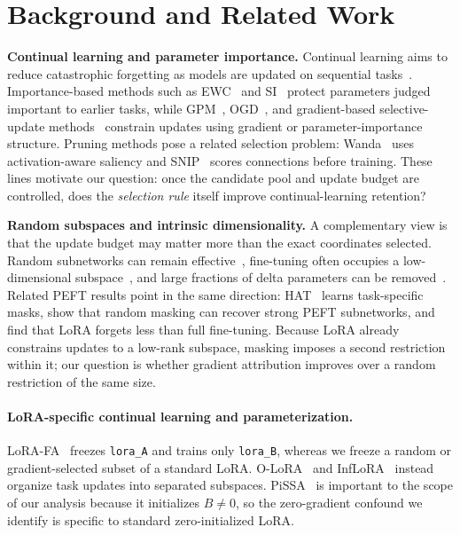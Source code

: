 \section{Background and Related Work}
\label{sec:background}

\textbf{Continual learning and parameter importance.}
Continual learning aims to reduce catastrophic forgetting as models are updated on sequential tasks~\citep{mccloskey1989catastrophic,french1999catastrophic}. Importance-based methods such as EWC~\citep{kirkpatrick2017overcoming} and SI~\citep{zenke2017continual} protect parameters judged important to earlier tasks, while GPM~\citep{saha2021gpm}, OGD~\citep{farajtabar2020ogd}, and gradient-based selective-update methods~\citep{qiao2024pegp,wang2025gorp} constrain updates using gradient or parameter-importance structure. Pruning methods pose a related selection problem: Wanda~\citep{sun2024wanda} uses activation-aware saliency and SNIP~\citep{lee2019snip} scores connections before training. These lines motivate our question: once the candidate pool and update budget are controlled, does the \emph{selection rule} itself improve continual-learning retention?

\textbf{Random subspaces and intrinsic dimensionality.}
A complementary view is that the update budget may matter more than the exact coordinates selected. Random subnetworks can remain effective~\citep{frankle2019lottery,ramanujan2020whats}, fine-tuning often occupies a low-dimensional subspace~\citep{aghajanyan2020intrinsic}, and large fractions of delta parameters can be removed~\citep{yu2024dare}. Related PEFT results point in the same direction: HAT~\citep{serra2018hat} learns task-specific masks, \citet{su2024random} show that random masking can recover strong PEFT subnetworks, and \citet{biderman2024lora} find that LoRA forgets less than full fine-tuning. Because LoRA already constrains updates to a low-rank subspace, masking imposes a second restriction within it; our question is whether gradient attribution improves over a random restriction of the same size.

\paragraph{LoRA-specific continual learning and parameterization.}
LoRA-FA~\citep{zhang2023lorafa} freezes \texttt{lora\_A} and trains only \texttt{lora\_B}, whereas we freeze a random or gradient-selected subset of a standard LoRA. O-LoRA~\citep{wang2023olora} and InfLoRA~\citep{liang2024inflora} instead organize task updates into separated subspaces. PiSSA~\citep{meng2024pissa} is important to the scope of our analysis because it initializes $B\neq0$, so the zero-gradient confound we identify is specific to standard zero-initialized LoRA.

